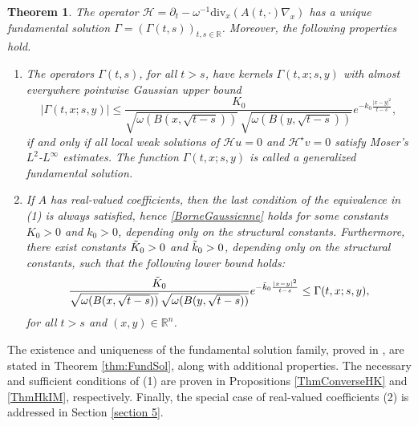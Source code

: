 \documentclass[12pt, letterpaper]{amsart}
\newtheorem{thm}{Theorem}[section]
\theoremstyle{definition}
\theoremstyle{remark}
\numberwithin{equation}{section}
\begin{document}
\begin{thm}\label{théorème principal}
The operator $\mathcal{H}=\partial_t  - \omega^{-1}\mathrm{div}_x (A(t,\cdot) \nabla_x )$ has a unique fundamental solution $\Gamma=(\Gamma(t,s))_{t,s \in \mathbb{R}}$. Moreover, the following properties hold.
\begin{enumerate}
    \item The operators $\Gamma(t,s)$, for all $t>s$, have kernels $\Gamma(t,x;s,y)$ with almost everywhere pointwise Gaussian upper bound 
    \begin{equation}\label{BorneGaussienne}
        \left | \Gamma(t,x;s,y) \right | \leq   \frac{K_0}{\sqrt{\omega( B(x,\sqrt{t-s})  )} \, \sqrt{\omega ( B(y,\sqrt{t-s}) )}}  e^{-k_0 \frac{\left | x-y \right |^2}{t-s}},
    \end{equation}
    if and only if all local weak solutions of $\mathcal{H}u=0$ and $\mathcal{H}^\star v=0$ satisfy Moser’s $L^2$-$L^\infty$ estimates. The function $\Gamma(t,x;s,y)$ is called a generalized fundamental solution.
    \item If $A$ has real-valued coefficients, then the last condition of the equivalence in (1) is always satisfied, hence \eqref{BorneGaussienne} holds for some constants $K_0 > 0$ and $k_0 > 0$, depending only on the structural constants. Furthermore, there exist constants $\Tilde{K}_0>0$ and $\Tilde{k}_0>0$, depending only on the structural constants, such that the following lower bound holds:
    $$ \frac{\Tilde{K}_0}{\sqrt{\omega( B(x,\sqrt{t-s})  )} \, \sqrt{\omega ( B(y,\sqrt{t-s}) )}}  e^{-\Tilde{k}_0 \frac{\left | x-y \right |^2}{t-s}} \leq  \Gamma(t,x;s,y), $$
    for all $t>s$ and $(x,y)\in \mathbb{R}^n$.
\end{enumerate}
\end{thm}

The existence and uniqueness of the fundamental solution family, proved in \cite{auscher2024fundamental}, are stated in Theorem \ref{thm:FundSol}, along with additional properties. The necessary and sufficient conditions of (1) are proven in Propositions \ref{ThmConverseHK} and \ref{ThmHkIM}, respectively. Finally, the special case of real-valued coefficients (2) is addressed in Section \ref{section 5}.
\end{document}

